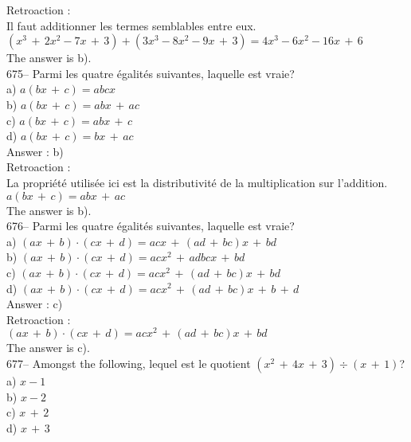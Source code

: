 ﻿\documentclass[letterpaper, 12pt]{article}
\begin{document}
Retroaction : \\
Il faut additionner les termes semblables entre eux.\\
$\left( x^{3}\,+\,2x^{2}-7x\,+\,3\right)  + \left(
3x^{3}-8x^{2}-9x\,+\,3\right) =4x^{3}-6x^{2}-16x\,+\,6$\\
The answer is b).\\

675-- Parmi les quatre \'egalit\'es suivantes, laquelle est vraie?\\
a) $a\left( bx\,+\,c\right) =abcx$\\
b) $a\left( bx\,+\,c\right) =abx\,+\,ac$\\
c) $a\left( bx\,+\,c\right) =abx\,+\,c$\\
d) $a\left( bx\,+\,c\right) =bx\,+\,ac$\\

Answer : b)\\

Retroaction : \\
La propri\'et\'e utilis\'ee ici est la distributivit\'e de la multiplication
sur l'addition.\\
$a\left( bx\,+\,c\right) =abx\,+\,ac$\\
The answer is b).\\

676-- Parmi les quatre \'egalit\'es suivantes, laquelle est vraie?\\
a) $\left( ax\,+\,b\right) \cdot\left( cx\,+\,d\right) =acx\,+\,\left(
ad\,+\,bc\right)x \,+\,bd$\\
b) $\left( ax\,+\,b\right) \cdot\left( cx\,+\,d\right) =acx^2\,+\,adbcx
\,+\,bd$\\
c) $\left( ax\,+\,b\right) \cdot\left( cx\,+\,d\right) =acx^2\,+\,\left(
ad\,+\,bc\right)x \,+\,bd$\\
d) $\left( ax\,+\,b\right) \cdot\left( cx\,+\,d\right) =acx^2\,+\,\left(
ad\,+\,bc\right)x \,+\,b\,+\,d$\\

Answer : c)\\

Retroaction : \\
$\left( ax\,+\,b\right) \cdot\left( cx\,+\,d\right) =acx^2\,+\,\left(
ad\,+\,bc\right)x \,+\,bd$\\
The answer is c).\\

677-- Amongst the following, lequel est le quotient $\left(
x^{2}\,+\,4x\,+\,3\right) \div \left( x\,+\,1\right)$?\\
a) $x-1$\\
b) $x-2$ \\
c) $x\,+\,2$\\
d) $x\,+\,3$\\
\end{document}
